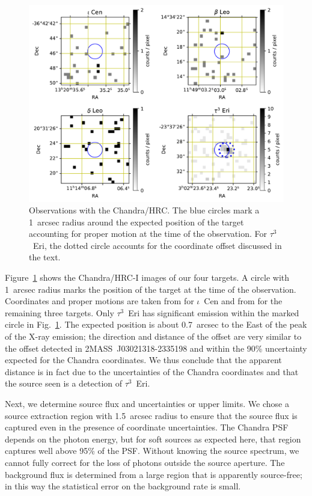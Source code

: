 \documentclass[preprint2]{aastex631}
\begin{document}
\begin{figure}
    \centering
    \includegraphics[width=\textwidth]{figures/chandra.pdf}
    \caption{Observations with the Chandra/HRC. The blue circles mark a 1~arcsec radius around the expected position of the target accounting for proper motion at the time of the observation. For $\tau^3$~Eri, the dotted circle accounts for the coordinate offset discussed in the text.
    \label{fig:chandra}}
\end{figure}

Figure~\ref{fig:chandra} shows the Chandra/HRC-I images of our four
targets. A circle with 1~arcsec radius marks the position of the
target at the time of the observation. Coordinates and proper motions
are taken from \citet{2018yCat.1345....0G} for $\iota$~Cen and from
\cite{2007A&A...474..653V} for the remaining three targets. Only
$\tau^3$~Eri has significant emission within the marked circle in
Fig.~\ref{fig:chandra}. The expected position is about 0.7~arcsec to
the East of the peak of the X-ray emission; the direction and distance of
the offset are very similar to the offset detected in
2MASS~J03021318-2335198 and within the 90\% uncertainty expected for
the Chandra coordinates. We thus conclude that the apparent distance
is in fact due to the uncertainties of the Chandra coordinates and
that the source seen is a detection of $\tau^3$~Eri. 

Next, we determine source flux and uncertainties or upper limits.
We chose a source extraction region with 1.5~arcsec
radius to ensure that the source flux is captured even in the
presence of coordinate uncertainties. The Chandra
PSF depends on the photon energy, but for
soft sources as expected here, that region captures well above 95\%
of the PSF. Without knowing the source spectrum, we cannot fully
correct for the loss of photons outside the source aperture. 
The background flux is determined from
a large region that is apparently source-free; in this way the
statistical error on the background rate is small.
\end{document}
